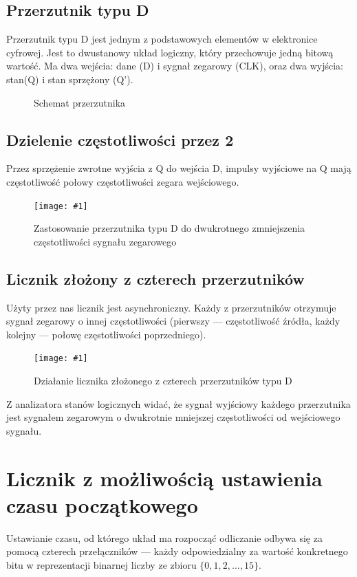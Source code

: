 \documentclass{article}
\newcommand{\image}[3]{
    \begin{figure}[H]
        \centering
        \captionsetup{font=small, skip=2pt}
        \texttt{[image: \#1]}
        \caption{#2}
    \end{figure}
}
\begin{document}
    \subsection{Przerzutnik typu D}
    Przerzutnik typu D jest jednym z podstawowych elementów w elektronice cyfrowej. Jest to dwustanowy układ logiczny, 
    który przechowuje jedną bitową wartość. Ma dwa wejścia: dane (D) i sygnał zegarowy (CLK), oraz dwa wyjścia: stan(Q)
    i stan sprzężony (Q'). 
    \begin{figure}[H]
        \centering
        \captionsetup{font=small, skip=2pt}
        \caption{Schemat przerzutnika}
    \end{figure} 

    \subsection{Dzielenie częstotliwości przez 2}
    Przez sprzężenie zwrotne wyjścia z Q do wejścia D, impulsy wyjściowe na Q mają częstotliwość połowy częstotliwości
    zegara wejściowego.
    
    \image{images/czestotliwosc_na_2}{Zastosowanie przerzutnika typu D do dwukrotnego zmniejszenia częstotliwości sygnału zegarowego}{scale=0.5}

    \subsection{Licznik złożony z czterech przerzutników}
    Użyty przez nas licznik jest asynchroniczny. Każdy z przerzutników otrzymuje sygnał zegarowy o innej częstotliwości
    (pierwszy --- częstotliwość źródła, każdy kolejny --- połowę częstotliwości poprzedniego).
    \image{images/licznik_analizator}{Działanie licznika złożonego z czterech przerzutników typu D}{scale=0.5}
    Z analizatora stanów logicznych widać, że sygnał wyjściowy każdego przerzutnika jest sygnałem zegarowym o
    dwukrotnie mniejszej częstotliwości od wejściowego sygnału.

    \section{Licznik z możliwością ustawienia czasu początkowego}
    Ustawianie czasu, od którego układ ma rozpocząć odliczanie odbywa się za pomocą czterech przełączników ---
    każdy odpowiedzialny za wartość konkretnego bitu w reprezentacji binarnej liczby ze zbioru \(\{0,1,2,\dots,15\}\).
\end{document}
